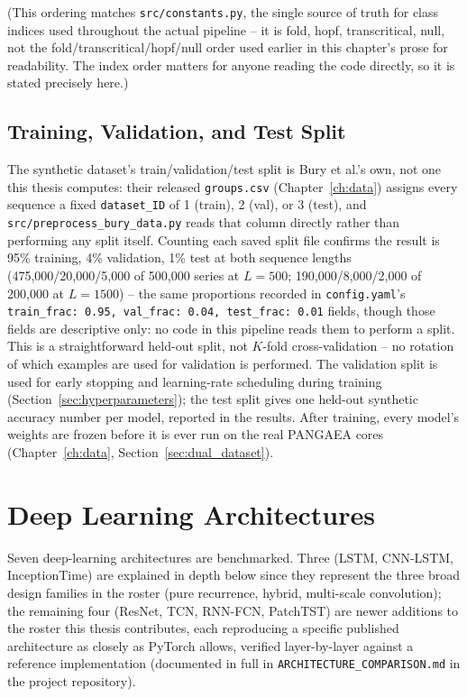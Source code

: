 (This ordering matches \texttt{src/constants.py}, the single source of truth for class indices used throughout the actual pipeline -- it is fold, hopf, transcritical, null, not the fold/transcritical/hopf/null order used earlier in this chapter's prose for readability. The index order matters for anyone reading the code directly, so it is stated precisely here.)

\subsection{Training, Validation, and Test Split}

The synthetic dataset's train/validation/test split is Bury et al.'s own, not one this thesis computes: their released \texttt{groups.csv} (Chapter~\ref{ch:data}) assigns every sequence a fixed \texttt{dataset\_ID} of 1 (train), 2 (val), or 3 (test), and \texttt{src/preprocess\_bury\_data.py} reads that column directly rather than performing any split itself. Counting each saved split file confirms the result is 95\% training, 4\% validation, 1\% test at both sequence lengths (475{,}000/20{,}000/5{,}000 of 500{,}000 series at $L=500$; 190{,}000/8{,}000/2{,}000 of 200{,}000 at $L=1500$) -- the same proportions recorded in \texttt{config.yaml}'s \texttt{train\_frac: 0.95, val\_frac: 0.04, test\_frac: 0.01} fields, though those fields are descriptive only: no code in this pipeline reads them to perform a split. This is a straightforward held-out split, not $K$-fold cross-validation -- no rotation of which examples are used for validation is performed. The validation split is used for early stopping and learning-rate scheduling during training (Section~\ref{sec:hyperparameters}); the test split gives one held-out synthetic accuracy number per model, reported in the results. After training, every model's weights are frozen before it is ever run on the real PANGAEA cores (Chapter~\ref{ch:data}, Section~\ref{sec:dual_dataset}).

\section{Deep Learning Architectures}
\label{sec:dl_architectures}

Seven deep-learning architectures are benchmarked. Three (LSTM, CNN-LSTM, InceptionTime) are explained in depth below since they represent the three broad design families in the roster (pure recurrence, hybrid, multi-scale convolution); the remaining four (ResNet, TCN, RNN-FCN, PatchTST) are newer additions to the roster this thesis contributes, each reproducing a specific published architecture as closely as PyTorch allows, verified layer-by-layer against a reference implementation (documented in full in \texttt{ARCHITECTURE\_COMPARISON.md} in the project repository).

